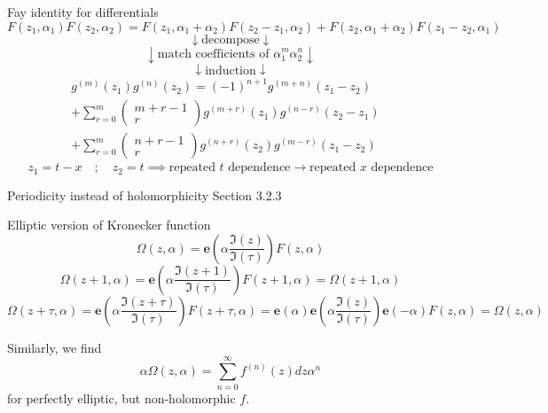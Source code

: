 \documentclass[11pt,aspectratio=169]{beamer}
\newcommand{\ee}[0]{\mathbf{e}}
\begin{document}
\begin{frame}{Fay identity for differentials}
    \[F(z_1,\alpha_1)F(z_2,\alpha_2) = F(z_1,\alpha_1+\alpha_2)F(z_2-z_1,\alpha_2)+F(z_2,\alpha_1+\alpha_2)F(z_1-z_2,\alpha_1)\]
    \[\downarrow \text{decompose} \downarrow\]
    \[\downarrow \text{match coefficients of }\alpha_1^m \alpha_2^n \downarrow\]
    \[\downarrow \text{induction} \downarrow\]
    \begin{align*}
        g^{(m)}(z_1) g^{(n)}(z_2) = (-1)^{n+1} g^{(m+n)}(z_1-z_2)& \\
         +\sum_{r=0}^m \begin{pmatrix} m+r-1 \\ r \end{pmatrix} g^{(m+r)}(z_1) g^{(n-r)}(z_2-z_1) & \\
         +\sum_{r=0}^m \begin{pmatrix} n+r-1 \\ r \end{pmatrix} g^{(n+r)}(z_2) g^{(m-r)}(z_1-z_2) & 
    \end{align*}
    \[z_1 = t-x \quad ; \quad z_2 = t \implies \text{repeated }t\text{ dependence} \rightarrow \text{repeated }x\text{ dependence}\]
\end{frame}

\begin{frame}{Periodicity instead of holomorphicity}{\tiny \cite{Broedel_2015} Section 3.2.3}
    \begin{block}{Elliptic version of Kronecker function}
        \[\Omega(z,\alpha) = \ee\left(\alpha \frac{\Im(z)}{\Im(\tau)}\right) F(z,\alpha)\]
        \vspace{+1em}
        \[\Omega(z+1,\alpha) = \ee\left(\alpha \frac{\Im(z+1)}{\Im(\tau)}\right) F(z+1,\alpha) = \Omega(z+1,\alpha)\]
        \[\Omega(z+\tau,\alpha) = \ee\left(\alpha \frac{\Im(z+\tau)}{\Im(\tau)}\right) F(z+\tau,\alpha) = \ee(\alpha) \ee\left(\alpha \frac{\Im(z)}{\Im(\tau)}\right) \ee(-\alpha) F(z,\alpha) = \Omega(z,\alpha)\]
    \end{block}
    
    Similarly, we find
    \[ \alpha \Omega(z,\alpha) = \sum_{n=0}^\infty f^{(n)}(z)dz \alpha^n \]
    for perfectly elliptic, but non-holomorphic $f$.

\end{frame}
\end{document}
